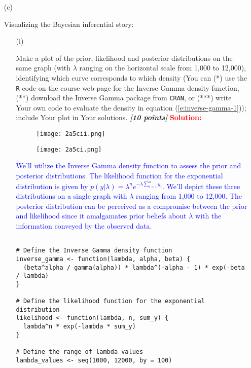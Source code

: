 \documentclass[12pt]{article}
\newcommand{\bi}[1]{\b{\i{#1}}}
\renewcommand{\b}[1]{\textbf{#1}}
\renewcommand{\i}[1]{\textit{#1}}
\renewcommand{\t}[1]{\texttt{#1}}
\begin{document}
\begin{itemize}
\begin{itemize}
\begin{itemize}
\begin{table}[t!]
\end{table}
\bigskip

\item[(c)] 

Visualizing the Bayesian inferential story:

\begin{itemize}

\item[(i)]

Make a plot of the prior, likelihood and posterior distributions on the same graph (with $\lambda$ ranging on the horizontal scale from 1,000 to 12,000), identifying which curve corresponds to which density (You can (*) use the \texttt{R} code on the course web page for the Inverse Gamma density function, (**) download the Inverse Gamma package from \t{CRAN}, or (***) write Your own code to evaluate the density in equation (\ref{e:inverse-gamma-1})); include Your plot in Your solutions. \bi{[10 points]}
\textcolor{red}{\textbf{Solution:}} \\
\begin{figure}[h]
    \centering
    \texttt{[image: 2a5cii.png]}
\end{figure}
\begin{figure}[h]
    \centering
    \texttt{[image: 2a5ci.png]}
\end{figure}
\textcolor{blue}{We'll utilize the Inverse Gamma density function to assess the prior and posterior distributions. The likelihood function for the exponential distribution is given by \( p(y|\lambda) = \lambda^n e^{-\lambda \sum_{i=1}^{n} y_i} \). We'll depict these three distributions on a single graph with \( \lambda \) ranging from 1,000 to 12,000. The posterior distribution can be perceived as a compromise between the prior and likelihood since it amalgamates prior beliefs about \( \lambda \) with the information conveyed by the observed data.}

\begin{verbatim}

# Define the Inverse Gamma density function
inverse_gamma <- function(lambda, alpha, beta) {
  (beta^alpha / gamma(alpha)) * lambda^(-alpha - 1) * exp(-beta / lambda)
}

# Define the likelihood function for the exponential distribution
likelihood <- function(lambda, n, sum_y) {
  lambda^n * exp(-lambda * sum_y)
}

# Define the range of lambda values
lambda_values <- seq(1000, 12000, by = 100)


\end{verbatim}
\end{itemize}
\end{itemize}
\end{itemize}
\end{itemize}
\end{document}
